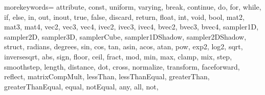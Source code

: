 %
{%
    morekeywords=   {%
                    attribute,%
                    const,%
                    uniform,%
                    varying,%
                    break,%
                    continue,%
                    do,%
                    for,%
                    while,%
                    if,%
                    else,%
                    in,%
                    out,%
                    inout,%
                    true,%
                    false,%
                    discard,%
                    return,%
                    float,%
                    int,%
                    void,%
                    bool,%
                    mat2,%
                    mat3,%
                    mat4,%
                    vec2,
                    vec3,%
                    vec4,%
                    ivec2,%
                    ivec3,%
                    ivec4,%
                    bvec2,%
                    bvec3,%
                    bvec4,%
                    sampler1D,%
                    sampler2D,%
                    sampler3D,%
                    samplerCube,%
                    sampler1DShadow,%
                    sampler2DShadow,%
                    struct,%
                    radians,%
                    degrees,%
                    sin,%
                    cos,%
                    tan,%
                    asin,%
                    acos,%
                    atan,%
                    pow,%
                    exp2,%
                    log2,%
                    sqrt,%
                    inversesqrt,%
                    abs,%
                    sign,%
                    floor,%
                    ceil,%
                    fract,%
                    mod,%
                    min,%
                    max,%
                    clamp,%
                    mix,%
                    step,%
                    smoothstep,%
                    length,%
                    distance,%
                    dot,%
                    cross,%
                    normalize,%
                    transform,%
                    faceforward,%
                    reflect,%
                    matrixCompMult,%
                    lessThan,%
                    lessThanEqual,%
                    greaterThan,%
                    greaterThanEqual,%
                    equal,%
                    notEqual,%
                    any,%
                    all,%
                    not,%
}}
